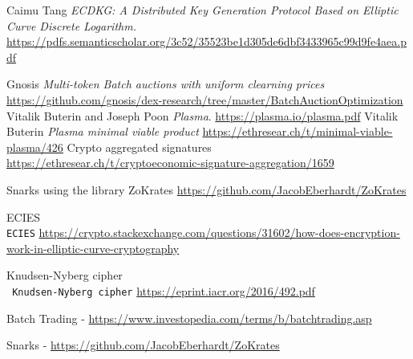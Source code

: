 \documentclass[11pt,parskip=full]{scrartcl}%
\begin{document}
\begin{thebibliography}{9}
Caimu Tang
\textit{ECDKG: A Distributed Key Generation Protocol Based on Elliptic
Curve Discrete Logarithm.}  
\href{https://pdfs.semanticscholar.org/3c52/35523be1d305de6dbf3433965c99d9fe4aea.pdf}{https://pdfs.semanticscholar.org/3c52/35523be1d305de6dbf3433965c99d9fe4aea.pdf}

Gnosis
\textit{Multi-token Batch auctions with uniform clearning prices} \newline
 \href{https://github.com/gnosis/dex-research/tree/master/BatchAuctionOptimization}
{https://github.com/gnosis/dex-research/tree/master/BatchAuctionOptimization}
Vitalik Buterin and Joseph Poon
\textit{Plasma}.
 \href{https://plasma.io/plasma.pdf}
{https://plasma.io/plasma.pdf}
Vitalik Buterin
\textit{Plasma minimal viable product}
 \href{https://ethresear.ch/t/minimal-viable-plasma/426}
 {https://ethresear.ch/t/minimal-viable-plasma/426}
Crypto aggregated signatures
\\\texttt{}
 \href{https://ethresear.ch/t/cryptoeconomic-signature-aggregation/1659}{https://ethresear.ch/t/cryptoeconomic-signature-aggregation/1659}

Snarks using the library ZoKrates
 \href{https://github.com/JacobEberhardt/ZoKrates}{https://github.com/JacobEberhardt/ZoKrates}

ECIES
\\\texttt{ECIES}
 \href{https://crypto.stackexchange.com/questions/31602/how-does-encryption-work-in-elliptic-curve-cryptography}{https://crypto.stackexchange.com/questions/31602/how-does-encryption-work-in-elliptic-curve-cryptography}

Knudsen-Nyberg cipher
\\\texttt{ Knudsen-Nyberg cipher}
 \href{https://eprint.iacr.org/2016/492.pdf}{https://eprint.iacr.org/2016/492.pdf}


Batch Trading - \href{https://www.investopedia.com/terms/b/batchtrading.asp}{https://www.investopedia.com/terms/b/batchtrading.asp}

 Snarks - \href{https://github.com/JacobEberhardt/ZoKrates}{https://github.com/JacobEberhardt/ZoKrates}

\end{thebibliography}
\end{document}

